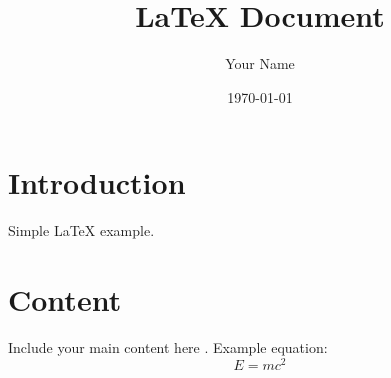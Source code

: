\documentclass[a4paper,12pt]{article}
\begin{document}
\title{LaTeX Document}
\author{Your Name}
\date{\today}
\maketitle

\section{Introduction}
Simple LaTeX example.

\section{Content}
Include your main content here \cite{cgal,delebecque:hal-02090402}. \cite{simplemapper-condensed,ad-wood-2003}
Example equation:
\begin{equation}
    E = mc^2
\end{equation}




\end{document}
